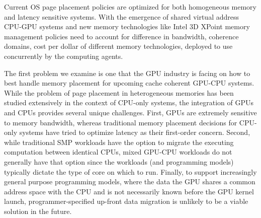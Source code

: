 Current OS page placement policies are optimized for both homogeneous memory and
latency sensitive systems. With the emergence of shared virtual address CPU-GPU
systems and new memory technologies like Intel 3D XPoint memory management
policies need to account for difference in bandwidth, coherence domains, cost
per dollar of different memory technologies, deployed to use concurrently by the
computing agents.

The first problem we examine is one that the GPU industry is
facing on how to best handle memory placement for upcoming cache coherent
GPU-CPU systems.  While the problem of page placement in heterogeneous memories
has been studied extensively in the context of CPU-only systems, the
integration of GPUs and CPUs provides several unique challenges.  First, GPUs
are extremely sensitive to memory bandwidth, whereas traditional memory
placement decisions for CPU-only systems have tried to optimize latency as their
first-order concern.  Second, while traditional SMP workloads have the option to
migrate the executing computation between identical CPUs, mixed GPU-CPU
workloads do not generally have that option since the workloads (and programming
models) typically dictate the type of core on which to run.  
Finally, to support increasingly general purpose programming models, where the
data the GPU shares a common address space with the CPU and is not necessarily
known before the GPU kernel launch, programmer-specified up-front data migration
is unlikely to be a viable solution in the future.

